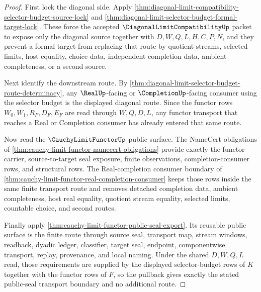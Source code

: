 \begin{proof}
First lock the diagonal side. Apply \autoref{thm:diagonal-limit-compatibility-selector-budget-source-lock} and \autoref{thm:diagonal-limit-selector-budget-formal-target-lock}. These force the accepted $\DiagonalLimitCompatibilityUp$ packet to expose only the diagonal source together with $D,W,Q,L,H,C,P,N$, and they prevent a formal target from replacing that route by quotient streams, selected limits, host equality, choice data, independent completion data, ambient completeness, or a second source.

Next identify the downstream route. By \autoref{thm:diagonal-limit-selector-budget-route-determinacy}, any $\RealUp$-facing or $\CompletionUp$-facing consumer using the selector budget is the displayed diagonal route. Since the functor rows $W_0,W_1,R_F,D_F,E_F$ are read through $W,Q,D,L$, any functor transport that reaches a Real or Completion consumer has already entered that same route.

Now read the $\CauchyLimitFunctorUp$ public surface. The NameCert obligations of \autoref{thm:cauchy-limit-functor-namecert-obligations} provide exactly the functor carrier, source-to-target seal exposure, finite observations, completion-consumer rows, and structural rows. The Real-completion consumer boundary of \autoref{thm:cauchy-limit-functor-real-completion-consumer} keeps those rows inside the same finite transport route and removes detached completion data, ambient completeness, host real equality, quotient stream equality, selected limits, countable choice, and second routes.

Finally apply \autoref{thm:cauchy-limit-functor-public-seal-export}. Its reusable public surface is the finite route through source seal, transport map, stream windows, readback, dyadic ledger, classifier, target seal, endpoint, componentwise transport, replay, provenance, and local naming. Under the shared $D,W,Q,L$ read, those requirements are supplied by the displayed selector-budget rows of $K$ together with the functor rows of $F$, so the pullback gives exactly the stated public-seal transport boundary and no additional route.
\end{proof}

